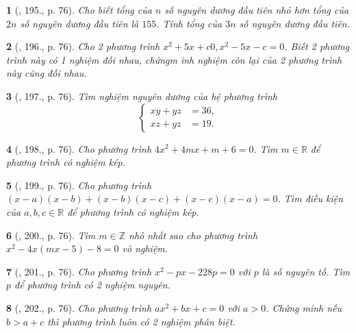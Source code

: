 \documentclass{article}
\newtheorem{baitoan}{}
\begin{document}
\begin{baitoan}[\cite{Tuyen_Toan_9_old}, 195., p. 76]
	Cho biết tổng của $n$ số nguyên dương đầu tiên nhỏ hơn tổng của $2n$ số nguyên dương đầu tiên là $155$. Tính tổng của $3n$ số nguyên dương đầu tiên.
\end{baitoan}

\begin{baitoan}[\cite{Tuyen_Toan_9_old}, 196., p. 76]
	Cho 2 phương trình $x^2 + 5x + c 0,x^2 - 5x - c = 0$. Biết 2 phương trình này có 1 nghiệm đối nhau, chứngm inh nghiệm còn lại của 2 phương trình này cũng đối nhau.
\end{baitoan}

\begin{baitoan}[\cite{Tuyen_Toan_9_old}, 197., p. 76]
	Tìm nghiệm nguyên dương của hệ phương trình
	\begin{equation*}
		\left\{\begin{split}
			xy + yz &= 36,\\
			xz + yz &= 19.
		\end{split}\right.
	\end{equation*}
\end{baitoan}

\begin{baitoan}[\cite{Tuyen_Toan_9_old}, 198., p. 76]
	Cho phương trình $4x^2 + 4mx + m + 6 = 0$. Tìm $m\in\mathbb{R}$ để phương trình có nghiệm kép.
\end{baitoan}

\begin{baitoan}[\cite{Tuyen_Toan_9_old}, 199., p. 76]
	Cho phương trình $(x - a)(x - b) + (x - b)(x - c) + (x - c)(x - a) = 0$. Tìm điều kiện của $a,b,c\in\mathbb{R}$ để phương trình có nghiệm kép.
\end{baitoan}

\begin{baitoan}[\cite{Tuyen_Toan_9_old}, 200., p. 76]
	Tìm $m\in\mathbb{Z}$ nhỏ nhất sao cho phương trình $x^2 - 4x(mx - 5) - 8 = 0$ vô nghiệm.
\end{baitoan}

\begin{baitoan}[\cite{Tuyen_Toan_9_old}, 201., p. 76]
	Cho phương trình $x^2 - px - 228p = 0$ với $p$ là số nguyên tố. Tìm $p$ để phương trình có 2 nghiệm nguyên.
\end{baitoan}

\begin{baitoan}[\cite{Tuyen_Toan_9_old}, 202., p. 76]
	Cho phương trình $ax^2 + bx + c = 0$ với $a > 0$. Chứng minh nếu $b > a + c$ thì phương trình luôn có 2 nghiệm phân biệt.
\end{baitoan}
\end{document}
